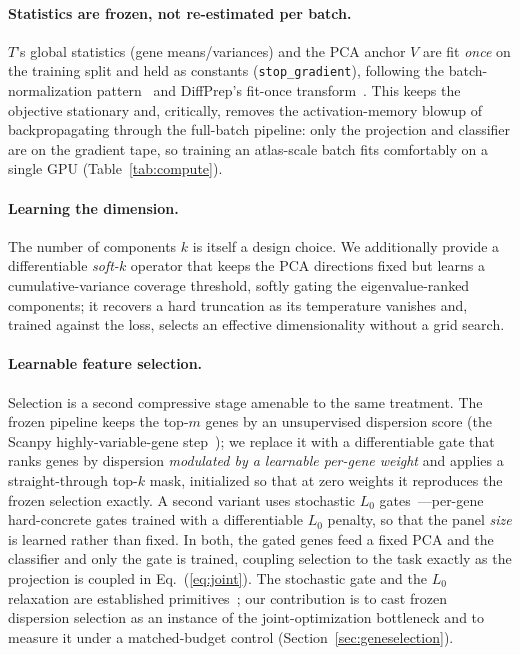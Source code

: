 \documentclass[10pt,twocolumn]{article}
\begin{document}
\paragraph{Statistics are frozen, not re-estimated per batch.} $T$'s global statistics
(gene means/variances) and the PCA anchor $V$ are fit \emph{once} on the training split
and held as constants (\texttt{stop\_gradient}), following the batch-normalization
pattern~\citep{ioffe2015batchnorm} and DiffPrep's fit-once transform~\citep{li2023diffprep}.
This keeps the objective stationary and, critically, removes the activation-memory blowup
of backpropagating through the full-batch pipeline: only the projection and classifier are
on the gradient tape, so training an atlas-scale batch fits comfortably on a single GPU
(Table~\ref{tab:compute}).

\paragraph{Learning the dimension.} The number of components $k$ is itself a design
choice. We additionally provide a differentiable \emph{soft-$k$} operator that keeps the
PCA directions fixed but learns a cumulative-variance coverage threshold, softly gating
the eigenvalue-ranked components; it recovers a hard truncation as its temperature
vanishes and, trained against the loss, selects an effective dimensionality without a grid
search.

\paragraph{Learnable feature selection.} Selection is a second compressive stage amenable to
the same treatment. The frozen pipeline keeps the top-$m$ genes by an unsupervised dispersion
score (the Scanpy highly-variable-gene step~\citep{wolf2018scanpy}); we replace it with a
differentiable gate that ranks genes by dispersion \emph{modulated by a learnable per-gene
weight} and applies a straight-through top-$k$ mask, initialized so that at zero weights it
reproduces the frozen selection exactly. A second variant uses stochastic $L_0$
gates~\citep{yamada2020stg,louizos2018l0}---per-gene hard-concrete gates trained with a
differentiable $L_0$ penalty, so that the panel \emph{size} is learned rather than fixed. In
both, the gated genes feed a fixed PCA and the classifier and only the gate is trained,
coupling selection to the task exactly as the projection is coupled in Eq.~(\ref{eq:joint}).
The stochastic gate and the $L_0$ relaxation are established
primitives~\citep{yamada2020stg,balin2019concrete,lemhadri2021lassonet,covert2023persist,louizos2018l0};
our contribution is to cast frozen dispersion selection as an instance of the joint-optimization
bottleneck and to measure it under a matched-budget control (Section~\ref{sec:geneselection}).
\end{document}
